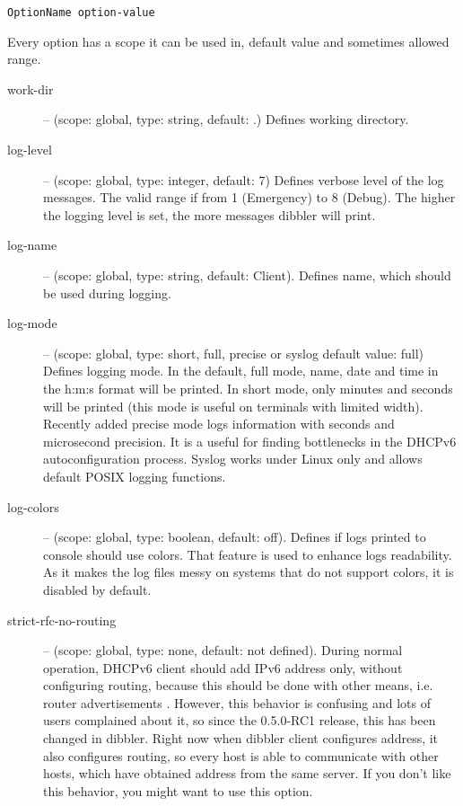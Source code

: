 \begin{verbatim}
OptionName option-value
\end{verbatim}

Every option has a scope it can be used in, default value and
sometimes allowed range.

\begin{description}
 \item[work-dir] -- (scope: global, type: string, default: .) Defines
   working directory.
 \item[log-level] -- (scope: global, type: integer, default: 7)
   Defines verbose level of the log messages. The valid range if from
   1 (Emergency) to 8 (Debug). The higher the logging level is set,
   the more messages dibbler will print.
 \item[log-name] -- (scope: global, type: string, default:
   Client). Defines name, which should be used during logging.
 \item[log-mode] -- (scope: global, type: short, full, precise or
   syslog default value: full) Defines logging mode. In the default,
   full mode, name, date and time in the h:m:s format will be
   printed. In short mode, only minutes and seconds will be printed
   (this mode is useful on terminals with limited width). Recently
   added precise mode logs information with seconds and microsecond
   precision. It is a useful for finding bottlenecks in the DHCPv6
   autoconfiguration process. Syslog works under Linux only and allows
   default POSIX logging functions.
\item[log-colors] -- (scope: global, type: boolean, default:
  off). Defines if logs printed to console should use colors. That
  feature is used to enhance logs readability.  As it makes the log
  files messy on systems that do not support colors, it is disabled by
  default.
 \item[strict-rfc-no-routing] -- (scope: global, type: none, default:
   not defined). During normal operation, DHCPv6 client should add
   IPv6 address only, without configuring routing, because this should
   be done with other means, i.e. router advertisements
   \cite{rfc2461}. However, this behavior is confusing and lots of
   users complained about it, so since the 0.5.0-RC1 release, this has
   been changed in dibbler. Right now when dibbler client configures
   address, it also configures routing, so every host is able to
   communicate with other hosts, which have obtained address from the
   same server. If you don't like this behavior, you might want to use
   this option.

\end{description}
